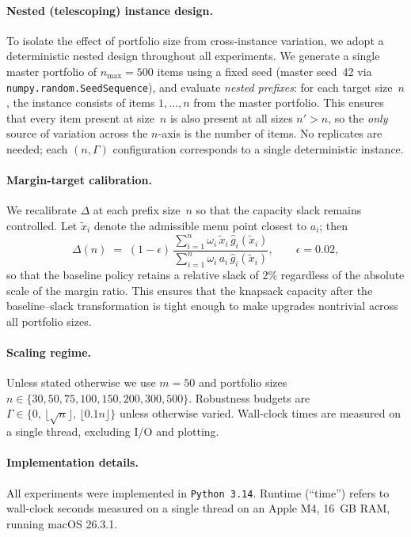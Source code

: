\documentclass[11pt, a4paper]{article}
\theoremstyle{plain}
\theoremstyle{definition}
\theoremstyle{remark}
\begin{document}
\paragraph{Nested (telescoping) instance design.}
To isolate the effect of portfolio size from cross-instance variation, we adopt a deterministic
nested design throughout all experiments. We generate a single master portfolio of
$n_{\max}=500$ items using a fixed seed (master seed~42 via
\texttt{numpy.random.SeedSequence}), and evaluate \emph{nested prefixes}: for each target
size~$n$, the instance consists of items $1,\dots,n$ from the master portfolio. This ensures
that every item present at size~$n$ is also present at all sizes $n'>n$, so the \emph{only}
source of variation across the $n$-axis is the number of items. No replicates are needed; each
$(n,\Gamma)$ configuration corresponds to a single deterministic instance.

\paragraph{Margin-target calibration.}
We recalibrate $\Delta$ at each prefix size~$n$ so that the capacity slack remains controlled.
Let $\tilde x_i$ denote the admissible menu point closest to $a_i$; then
\[
\Delta(n) \;=\; (1-\epsilon)\,
\frac{\displaystyle\sum_{i=1}^n\omega_i\,\tilde x_i\,\hat g_i(\tilde x_i)}%
{\displaystyle\sum_{i=1}^n\omega_i\,a_i\,\hat g_i(\tilde x_i)},
\qquad \epsilon=0.02,
\]
so that the baseline policy retains a relative slack of $2\%$ regardless of the absolute scale
of the margin ratio. This ensures that the knapsack capacity after the baseline--slack
transformation is tight enough to make upgrades nontrivial across all portfolio sizes.

\paragraph{Scaling regime.}
Unless stated otherwise we use $m=50$ and portfolio sizes
$n\in\{30,\allowbreak 50,\allowbreak 75,\allowbreak 100,\allowbreak 150,\allowbreak 200,\allowbreak 300,\allowbreak 500\}$.
Robustness budgets are
$\Gamma\in\{0,\,\lfloor\sqrt n\rfloor,\,\lfloor 0.1 n\rfloor\}$ unless otherwise varied.
Wall-clock times are measured on a single thread, excluding I/O and plotting.

\paragraph{Implementation details.}
All experiments were implemented in \texttt{Python 3.14}. Runtime (“time”) refers to wall-clock seconds measured on a single thread on an Apple M4, 16~GB RAM, running macOS 26.3.1.
\end{document}
